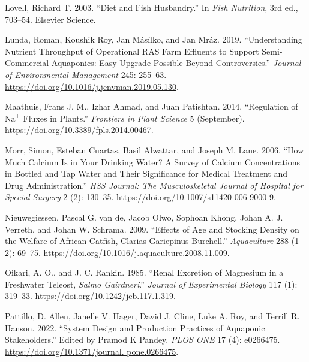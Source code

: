 \documentclass[preprint, 3p,
authoryear]{elsarticle} %
\newlength{\cslhangindent}
\newlength{\cslentryspacingunit} %
\newenvironment{CSLReferences}[2] %
 {%
  \setlength{\parindent}{0pt}
  \ifodd #1
  \let\oldpar\par
  \def\par{\hangindent=\cslhangindent\oldpar}
  \fi
  \setlength{\parskip}{#2\cslentryspacingunit}
 }%
 {}
\begin{document}
\begin{CSLReferences}{1}{0}
\leavevmode{}%
Lovell, Richard T. 2003. {``Diet and Fish Husbandry.''} In \emph{Fish
Nutrition}, 3rd ed., 703--54. Elsevier Science.

\leavevmode{}%
Lunda, Roman, Koushik Roy, Jan Másílko, and Jan Mráz. 2019.
{``Understanding Nutrient Throughput of Operational {RAS} Farm Effluents
to Support Semi-Commercial Aquaponics: Easy Upgrade Possible Beyond
Controversies.''} \emph{Journal of Environmental Management} 245:
255--63. \url{https://doi.org/10.1016/j.jenvman.2019.05.130}.

\leavevmode{}%
Maathuis, Frans J. M., Izhar Ahmad, and Juan Patishtan. 2014.
{``Regulation of \(\text{Na}^{+}\) Fluxes in Plants.''} \emph{Frontiers
in Plant Science} 5 (September).
\url{https://doi.org/10.3389/fpls.2014.00467}.

\leavevmode{}%
Morr, Simon, Esteban Cuartas, Basil Alwattar, and Joseph M. Lane. 2006.
{``How Much Calcium Is in Your Drinking Water? A Survey of Calcium
Concentrations in Bottled and Tap Water and Their Significance for
Medical Treatment and Drug Administration.''} \emph{{HSS}
Journal{\textregistered}: The Musculoskeletal Journal of Hospital for
Special Surgery} 2 (2): 130--35.
\url{https://doi.org/10.1007/s11420-006-9000-9}.

\leavevmode{}%
Nieuwegiessen, Pascal G. van de, Jacob Olwo, Sophoan Khong, Johan A. J.
Verreth, and Johan W. Schrama. 2009. {``Effects of Age and Stocking
Density on the Welfare of African Catfish, Clarias Gariepinus
Burchell.''} \emph{Aquaculture} 288 (1-2): 69--75.
\url{https://doi.org/10.1016/j.aquaculture.2008.11.009}.

\leavevmode{}%
Oikari, A. O., and J. C. Rankin. 1985. {``Renal Excretion of Magnesium
in a Freshwater Teleost, \emph{Salmo Gairdneri}.''} \emph{Journal of
Experimental Biology} 117 (1): 319--33.
\url{https://doi.org/10.1242/jeb.117.1.319}.

\leavevmode{}%
Pattillo, D. Allen, Janelle V. Hager, David J. Cline, Luke A. Roy, and
Terrill R. Hanson. 2022. {``System Design and Production Practices of
Aquaponic Stakeholders.''} Edited by Pramod K Pandey. \emph{{PLOS}
{ONE}} 17 (4): e0266475.
\href{https://doi.org/10.1371/journal.\%20pone.0266475}{https://doi.org/10.1371/journal.
pone.0266475}.


\end{CSLReferences}
\end{document}
